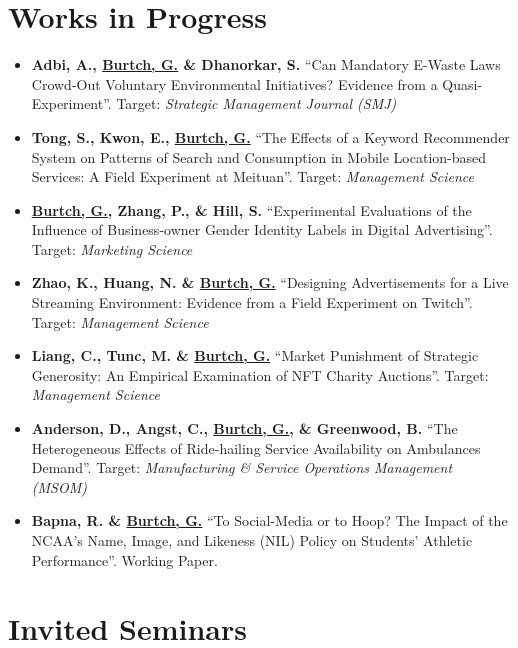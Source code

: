 \documentclass[10.5pt,letterpaper,sans]{moderncv}        %
\begin{document}
\section{Works in Progress}

\begin{itemize}[leftmargin=!,labelindent=5pt,itemindent=-15pt]

\item \textbf{Adbi, A., \underline{Burtch, G.} \& Dhanorkar, S.} ``Can Mandatory E-Waste Laws Crowd-Out Voluntary Environmental Initiatives? Evidence from a Quasi-Experiment''. Target: \textit{Strategic Management Journal (SMJ)}

\item \textbf{Tong, S., Kwon, E., \underline{Burtch, G.}} ``The Effects of a Keyword Recommender System on Patterns of Search and Consumption in Mobile Location-based Services: A Field Experiment at Meituan''. Target: \textit{Management Science} 

\item \textbf{\underline{Burtch, G.}, Zhang, P., \& Hill, S.} ``Experimental Evaluations of the Influence of Business-owner Gender Identity Labels in Digital Advertising''. Target: \textit{Marketing Science} 

\item \textbf{Zhao, K., Huang, N. \& \underline{Burtch, G.}} ``Designing Advertisements for a Live Streaming Environment: Evidence from a Field Experiment on Twitch''. Target: \textit{Management Science}

\item \textbf{Liang, C., Tunc, M. \& \underline{Burtch, G.}} ``Market Punishment of Strategic Generosity: An Empirical Examination of NFT Charity Auctions''. Target: \textit{Management Science}

\item \textbf{Anderson, D., Angst, C., \underline{Burtch, G.}, \& Greenwood, B.} ``The Heterogeneous Effects of Ride-hailing Service Availability on Ambulances Demand''. Target: \textit{Manufacturing \& Service Operations Management (MSOM)}

\item \textbf{Bapna, R. \& \underline{Burtch, G.}} ``To Social-Media or to Hoop? The Impact of the NCAA's Name, Image, and Likeness (NIL) Policy on Students' Athletic Performance''. Working Paper.

\end{itemize}

\section{Invited Seminars}
\end{document}

